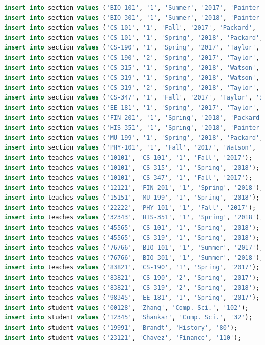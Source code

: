 \documentclass{article}
\begin{document}
\begin{lstlisting}[language=sql]
insert into section values ('BIO-101', '1', 'Summer', '2017', 'Painter', '514', 'B');
insert into section values ('BIO-301', '1', 'Summer', '2018', 'Painter', '514', 'A');
insert into section values ('CS-101', '1', 'Fall', '2017', 'Packard', '101', 'H');
insert into section values ('CS-101', '1', 'Spring', '2018', 'Packard', '101', 'F');
insert into section values ('CS-190', '1', 'Spring', '2017', 'Taylor', '3128', 'E');
insert into section values ('CS-190', '2', 'Spring', '2017', 'Taylor', '3128', 'A');
insert into section values ('CS-315', '1', 'Spring', '2018', 'Watson', '120', 'D');
insert into section values ('CS-319', '1', 'Spring', '2018', 'Watson', '100', 'B');
insert into section values ('CS-319', '2', 'Spring', '2018', 'Taylor', '3128', 'C');
insert into section values ('CS-347', '1', 'Fall', '2017', 'Taylor', '3128', 'A');
insert into section values ('EE-181', '1', 'Spring', '2017', 'Taylor', '3128', 'C');
insert into section values ('FIN-201', '1', 'Spring', '2018', 'Packard', '101', 'B');
insert into section values ('HIS-351', '1', 'Spring', '2018', 'Painter', '514', 'C');
insert into section values ('MU-199', '1', 'Spring', '2018', 'Packard', '101', 'D');
insert into section values ('PHY-101', '1', 'Fall', '2017', 'Watson', '100', 'A');
insert into teaches values ('10101', 'CS-101', '1', 'Fall', '2017');
insert into teaches values ('10101', 'CS-315', '1', 'Spring', '2018');
insert into teaches values ('10101', 'CS-347', '1', 'Fall', '2017');
insert into teaches values ('12121', 'FIN-201', '1', 'Spring', '2018');
insert into teaches values ('15151', 'MU-199', '1', 'Spring', '2018');
insert into teaches values ('22222', 'PHY-101', '1', 'Fall', '2017');
insert into teaches values ('32343', 'HIS-351', '1', 'Spring', '2018');
insert into teaches values ('45565', 'CS-101', '1', 'Spring', '2018');
insert into teaches values ('45565', 'CS-319', '1', 'Spring', '2018');
insert into teaches values ('76766', 'BIO-101', '1', 'Summer', '2017');
insert into teaches values ('76766', 'BIO-301', '1', 'Summer', '2018');
insert into teaches values ('83821', 'CS-190', '1', 'Spring', '2017');
insert into teaches values ('83821', 'CS-190', '2', 'Spring', '2017');
insert into teaches values ('83821', 'CS-319', '2', 'Spring', '2018');
insert into teaches values ('98345', 'EE-181', '1', 'Spring', '2017');
insert into student values ('00128', 'Zhang', 'Comp. Sci.', '102');
insert into student values ('12345', 'Shankar', 'Comp. Sci.', '32');
insert into student values ('19991', 'Brandt', 'History', '80');
insert into student values ('23121', 'Chavez', 'Finance', '110');

\end{lstlisting}
\end{document}
